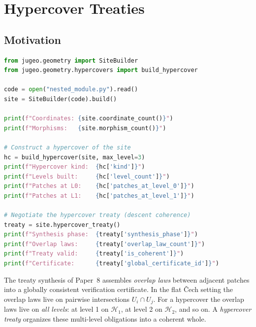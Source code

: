 \documentclass[11pt]{article}
\newcommand{\HC}{\mathcal{H}}              %
\begin{document}
\section{Hypercover Treaties}\label{sec:treaties}

\subsection{Motivation}

\begin{lstlisting}[language=Python, caption={Building a hypercover and negotiating a treaty via the \JuGeo{} geometry API.}]
from jugeo.geometry import SiteBuilder
from jugeo.geometry.hypercovers import build_hypercover

code = open("nested_module.py").read()
site = SiteBuilder(code).build()

print(f"Coordinates: {site.coordinate_count()}")
print(f"Morphisms:   {site.morphism_count()}")

# Construct a hypercover of the site
hc = build_hypercover(site, max_level=3)
print(f"Hypercover kind:  {hc['kind']}")
print(f"Levels built:     {hc['level_count']}")
print(f"Patches at L0:    {hc['patches_at_level_0']}")
print(f"Patches at L1:    {hc['patches_at_level_1']}")

# Negotiate the hypercover treaty (descent coherence)
treaty = site.hypercover_treaty()
print(f"Synthesis phase:  {treaty['synthesis_phase']}")
print(f"Overlap laws:     {treaty['overlap_law_count']}")
print(f"Treaty valid:     {treaty['is_coherent']}")
print(f"Certificate:      {treaty['global_certificate_id']}")
\end{lstlisting}

The treaty synthesis of Paper~8 assembles \emph{overlap laws}
between adjacent patches into a globally consistent verification
certificate.  In the flat Čech setting the overlap laws live on
pairwise intersections $U_i \cap U_j$.  For a hypercover the overlap
laws live on \emph{all levels}: at level 1 on $\HC_1$, at level 2
on $\HC_2$, and so on.  A \emph{hypercover treaty} organizes these
multi-level obligations into a coherent whole.
\end{document}
